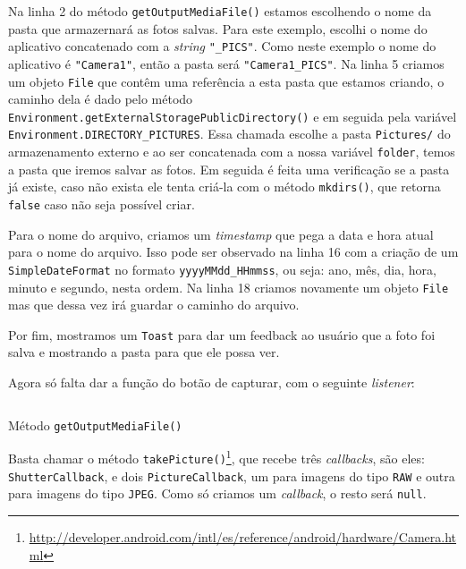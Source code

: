 \documentclass[a4paper,12pt,brazil,oneside]{book}
\begin{document}
\begin{singlespace}
		Na linha 2 do método \texttt{getOutputMediaFile()} estamos escolhendo o nome da pasta que armazernará as fotos salvas. Para este exemplo, escolhi o nome do aplicativo concatenado com a \emph{string} \texttt{"\_PICS"}. Como neste exemplo o nome do aplicativo é \texttt{"Camera1"}, então a pasta será \texttt{"Camera1\_PICS"}. Na linha 5 criamos um objeto \texttt{File} que contêm uma referência a esta pasta que estamos criando, o caminho dela é dado pelo método \\ \texttt{Environment.getExternalStoragePublicDirectory()} e em seguida pela variável \texttt{Environment.DIRECTORY\_PICTURES}. Essa chamada escolhe a pasta \texttt{Pictures/} do armazenamento externo e ao ser concatenada com a nossa variável \texttt{folder}, temos a pasta que iremos salvar as fotos. Em seguida é feita uma verificação se a pasta já existe, caso não exista ele tenta criá-la com o método \texttt{mkdirs()}, que retorna \texttt{false} caso não seja possível criar.

		Para o nome do arquivo, criamos um \emph{timestamp} que pega a data e hora atual para o nome do arquivo. Isso pode ser observado na linha 16 com a criação de um \texttt{SimpleDateFormat} no formato \texttt{yyyyMMdd\_HHmmss}, ou seja: ano, mês, dia, hora, minuto e segundo, nesta ordem. Na linha 18 criamos novamente um objeto \texttt{File} mas que dessa vez irá guardar o caminho do arquivo. 

		Por fim, mostramos um \texttt{Toast} para dar um feedback ao usuário que a foto foi salva e mostrando a pasta para que ele possa ver. 

		Agora só falta dar a função do botão de capturar, com o seguinte \emph{listener}:

		\begin{listing}[H]
		\inputminted[linenos=true,fontsize=\small,frame=lines, framesep=2mm, tabsize=2,numbersep=5pt]{java}{src/api/camera/takepic.java}
		\caption{Método \texttt{getOutputMediaFile()}}
		\label{code:camera-takepic}
		\end{listing} 			

		Basta chamar o método \texttt{takePicture()}\footnote{\href{http://developer.android.com/intl/es/reference/android/hardware/Camera.html}{http://developer.android.com/intl/es/reference/android/hardware/Camera.html}}, que recebe três \emph{callbacks}, são eles: \\ \texttt{ShutterCallback}, e dois \texttt{PictureCallback}, um para imagens do tipo \texttt{RAW} e outra para imagens do tipo \texttt{JPEG}. Como só criamos um \emph{callback}, o resto será \texttt{null}.
		

\end{singlespace}
\end{document}
